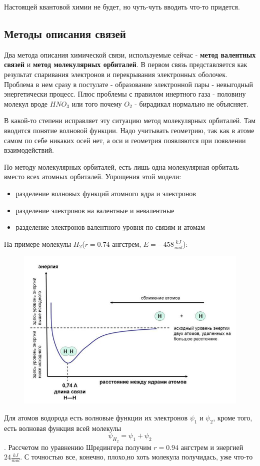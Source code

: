 \documentclass[11pt]{article}
\begin{document}
Настоящей квантовой химии не будет, но чуть-чуть вводить что-то придется. 
\subsection*{Методы описания связей}
Два метода описания химической связи, используемые сейчас - \textbf{метод валентных связей} и \textbf{метод молекулярных орбиталей}.
В первом связь представляется как результат спаривания электронов и перекрывания электронных оболочек. Проблема в нем сразу в постулате - образование электронной пары - невыгодный энергетически процесс. Плюс проблемы с правилом инертного газа - половину молекул вроде $HNO_3$ или того почему $O_2$ - бирадикал нормально не объясняет.

В какой-то степени исправляет эту ситуацию метод молекулярных орбиталей. Там вводится понятие волновой функции. Надо учитывать геометрию, так как в атоме самом по себе никаких осей нет, а оси и геометрия появляются при появлении взаимодействий.

По методу молекулярных орбиталей, есть лишь одна молекулярная орбиталь вместо всех атомных орбиталей. Упрощения этой модели: 
\begin{itemize}
\item разделение волновых функций атомного ядра и электронов
\item разделение электронов на валентные и невалентные
\item разделение электронов валентного уровня по связям и атомам
\end{itemize}

На примере молекулы $H_2$($r=0.74$ ангстрем, $E = -458 \frac{kJ}{mol}$):
\begin{figure}[htp]
\centering
\includegraphics[scale=2.00]{h2-er.png}
\caption{}
\label{}
\end{figure}
Для атомов водорода есть волновые функции их электронов $\psi_1$ и $\psi_2$, кроме того, есть волновая функция всей молекулы $$\psi_{H_2} = \psi_1 + \psi_2$$. Рассчетом по уравнению Шредингера получим $r=0.94$ ангстрем и энергией $24 \frac{kJ}{mol}$. С точностью все, конечно, плохо,но хоть молекула получидась, уже что-то
\end{document}
